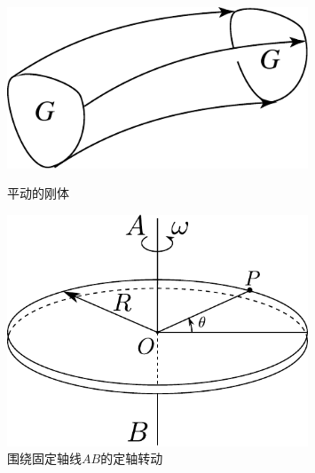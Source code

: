 \begin{figure}[hbtp]

\begin{minipage}[t]{0.5\linewidth}
\centering
\includegraphics[width=0.8\textwidth]{images/rb-theory-2.pdf}
\caption{平动的刚体}
\label{fig: rb-平动的刚体}
\end{minipage}%
\begin{minipage}[t]{0.5\linewidth}
\centering
\includegraphics[width=0.8\textwidth]{images/rb-rotation-about-fixed-axis.pdf}
\caption{围绕固定轴线$AB$的定轴转动}
\label{fig: rb-rotation-about-fixed-axis}
\end{minipage}%
\end{figure}
